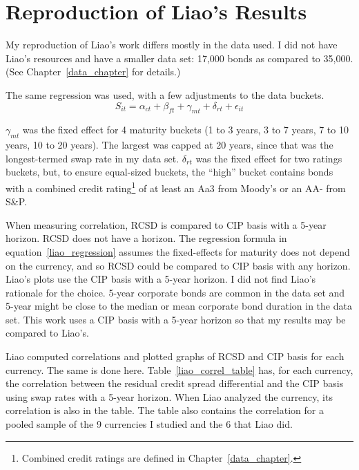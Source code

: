

\section{Reproduction of Liao's Results}


My reproduction of Liao's work differs mostly in the data used.  I did not have Liao's resources and have a smaller data set: 17,000 bonds as compared to 35,000.  (See Chapter~\ref{data_chapter} for details.)

The same regression was used, with a few adjustments to the data buckets.  
\begin{equation}
  S_{it} = \alpha_{ct} + \beta_{ft} + \gamma_{mt} + \delta_{rt} + \epsilon_{it} 
\end{equation}

\noindent $\gamma_{mt}$ was the fixed effect for 4 maturity buckets (1 to 3 years, 3 to 7 years, 7 to 10 years, 10 to 20 years).  The largest was capped at 20 years, since that was the longest-termed swap rate in my data set.  $\delta_{rt}$ was the fixed effect for two ratings buckets, but, to ensure equal-sized buckets, the ``high'' bucket contains bonds with a combined credit rating\footnote{Combined credit ratings are defined in Chapter~\ref{data_chapter}.} of at least an Aa3 from Moody's or an AA- from S\&P.



When measuring correlation, RCSD is compared to CIP basis with a 5-year horizon.  RCSD does not have a horizon.  The regression formula in equation~\ref{liao_regression} assumes the fixed-effects for maturity does not depend on the currency, and so RCSD could be compared to CIP basis with any horizon.  Liao's plots use the CIP basis with a 5-year horizon.  I did not find Liao's rationale for the choice.  5-year corporate bonds are common in the data set and 5-year might be close to the median or mean corporate bond duration in the data set.  This work uses a CIP basis with a 5-year horizon so that my results may be compared to Liao's.  

Liao computed correlations and plotted graphs of RCSD and CIP basis for each currency.  The same is done here.  Table~\ref{liao_correl_table} has, for each currency, the correlation between the residual credit spread differential and the CIP basis using swap rates with a 5-year horizon.  When Liao analyzed the currency, its correlation is also in the table.  The table also contains the correlation for a pooled sample of the 9 currencies I studied and the 6 that Liao did.

